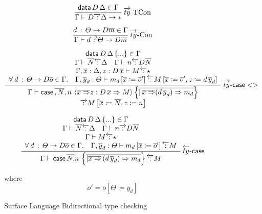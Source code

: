 \begin{figure}
\[
\frac{\mathsf{data}\,D\,\Delta\in\Gamma}{\Gamma\vdash D\overrightarrow{\,:\,}\Delta\rightarrow*}\operatorname{\overrightarrow{ty}-TCon}
\]

\[
\frac{d\,:\,\varTheta\rightarrow D\overline{m}\in\Gamma}{\Gamma\vdash d\overrightarrow{\,:\,}\varTheta\rightarrow D\overline{m}}\operatorname{\overrightarrow{ty}-Con}
\]

\[
\frac{\begin{array}{c}
\mathsf{data}\,D\,\Delta\left\{ ...\right\} \in\Gamma\\
\Gamma\vdash\overline{N}\overleftarrow{\,:\,}\Delta\quad\Gamma\vdash n\overleftarrow{\,:\,}D\overline{N}\\
\Gamma,\overline{x}:\Delta,z:D\,\overline{x}\vdash M\overleftarrow{\,:\,}\star\\
\forall\:d\,:\,\varTheta\rightarrow D\overline{o}\in\Gamma.\quad\Gamma,\overline{y}_{d}:\varTheta\vdash m_{d}\left[\overline{x}\coloneqq\overline{o}'\right]\overleftarrow{\,:\,}M\left[\overline{x}\coloneqq\overline{o}',z\coloneqq d\,\overline{y}_{d}\right]
\end{array}}{\begin{array}{c}
\Gamma\vdash\mathsf{case}\,\overline{,N},n\,\left\langle \overline{x\Rightarrow}z:D\,\overline{x}\Rightarrow M\right\rangle \left\{ \overline{|\,\overline{x\Rightarrow}(d\,\overline{y}_{d})\Rightarrow m_{d}}\right\} \\
\overrightarrow{\,:\,}M\left[\overline{x}\coloneqq\overline{N},z\coloneqq n\right]
\end{array}
}\operatorname{\overrightarrow{ty}-\mathsf{case}{}<>}
\]

\[
\frac{\begin{array}{c}
\mathsf{data}\,D\,\Delta\left\{ ...\right\} \in\Gamma\\
\Gamma\vdash\overline{N}\overleftarrow{\,:\,}\Delta\quad\Gamma\vdash n\overrightarrow{\,:\,}D\overline{N}\\
\Gamma\vdash M\overleftarrow{\,:\,}\star\\
\forall\:d\,:\,\varTheta\rightarrow D\overline{o}\in\Gamma.\quad\Gamma,\overline{y}_{d}:\varTheta\vdash m_{d}\left[\overline{x}\coloneqq\overline{o}'\right]\overleftarrow{\,:\,}M
\end{array}}{
  \Gamma\vdash\mathsf{case}\,\overline{N,}n\,\left\{ \overline{|\overline{x\Rightarrow}\,(d\,\overline{y}_{d})\Rightarrow m_{d}}\right\} \overleftarrow{\,:\,}M
}\operatorname{\overleftarrow{ty}-\mathsf{case}{}}
\]

where 
\[
\overline{o}'= \overline{o}\left[\varTheta \coloneqq \overline{y}_{d} \right]
\]
\caption{Surface Language Bidirectional type checking }
\label{fig:surface-data-bi-ty}
\end{figure}

